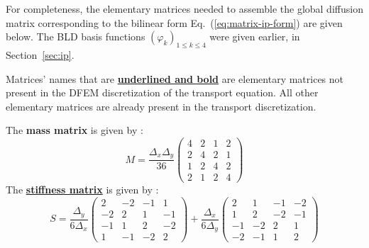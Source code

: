 \documentclass{mc2013}
\newcommand\br{\mathbf{r}}
\newcommand\tf{\varphi}
\renewcommand{\(}{\left(}
\renewcommand{\)}{\right)}
\renewcommand{\[}{\left[}
\renewcommand{\]}{\right]}
\newcommand{\eqt}[1]{Eq.~(\ref{#1})}                     %
\begin{document}
For completeness, the elementary matrices needed to assemble the global diffusion matrix corresponding to the
bilinear form \eqt{eq:matrix-ip-form} are given below. The BLD basis functions $\( \tf_{k} \)_{1 \le k \le 4}$
were given earlier, in Section~\ref{sec:ip}. 

Matrices' names that are \underline{{\bf underlined and bold}} are elementary matrices not present in the DFEM
discretization of the transport equation. All other elementary matrices are already present in the transport discretization.

The {\bf mass matrix} is given by :
\begin{equation}
M = \frac{{\Delta _x}{\Delta _y}}{36}
\begin{pmatrix}
4 & 2 & 1 & 2 \\
2 & 4 & 2 & 1 \\
1 & 2 & 4 & 2 \\
2 & 1 & 2 & 4 
\end{pmatrix}
\end{equation}
%
%
%
%
%
%
The \underline{{\bf stiffness matrix}} is given by :
\begin{equation}
S = \frac{{\Delta _y}}{6{\Delta _x}}
\begin{pmatrix}
2 & -2 & -1 & 1 \\
-2 & 2 & 1 & -1 \\
-1 & 1 & 2 & -2 \\
1 & -1 & -2 & 2 
\end{pmatrix}
+ \frac{{\Delta _x}}{6{\Delta _y}}
\begin{pmatrix}
2 & 1 & -1 & -2 \\
1 & 2 & -2 & -1 \\
-1 & -2 & 2 & 1 \\
-2 & -1 & 1 & 2 
\end{pmatrix}
\end{equation}
\end{document}
